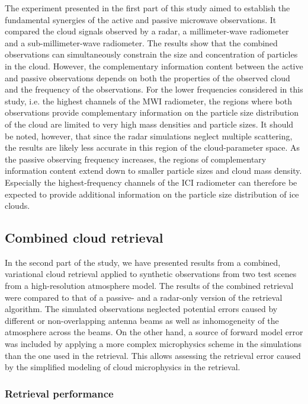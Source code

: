 \documentclass[journal abbreviation, manuscript]{copernicus}
\begin{document}
The experiment presented in the first part of this study aimed to establish the
fundamental synergies of the active and passive microwave observations. It
compared the cloud signals observed by a radar, a millimeter-wave radiometer and
a sub-millimeter-wave radiometer. The results show that the combined
observations can simultaneously constrain the size and concentration of particles
in the cloud. However, the complementary information content
between the active and passive observations depends on both the properties of
the observed cloud and the frequency of the observations. For the lower
frequencies considered in this study, i.e. the highest channels of the MWI
radiometer, the regions where both observations provide complementary
information on the particle size distribution of the cloud are limited to very
high mass densities and particle sizes. It should be noted, however, that since
the radar simulations neglect multiple scattering, the results are likely less
accurate in this region of the cloud-parameter space. As the passive observing
frequency increases, the regions of complementary information content extend
down to smaller particle sizes and cloud mass density. Especially the
highest-frequency channels of the ICI radiometer can therefore be expected to
provide additional information on the particle size distribution of ice clouds.

\subsection{Combined cloud retrieval}

In the second part of the study, we have presented results from a combined,
variational cloud retrieval applied to synthetic observations from two test
scenes from a high-resolution atmosphere model. The results of the combined
retrieval were compared to that of a passive- and a radar-only version of the
retrieval algorithm. The simulated observations neglected potential errors
caused by different or non-overlapping antenna beams as well as inhomogeneity of
the atmosphere across the beams. On the other hand, a source of forward model
error was included by applying a more complex microphysics scheme in the
simulations than the one used in the retrieval. This allows assessing the
retrieval error caused by the simplified modeling of cloud microphysics in the
retrieval.

\subsubsection{Retrieval performance}
\end{document}
